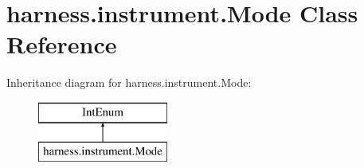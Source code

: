 \hypertarget{classharness_1_1instrument_1_1_mode}{}\section{harness.\+instrument.\+Mode Class Reference}
\label{classharness_1_1instrument_1_1_mode}
Inheritance diagram for harness.\+instrument.\+Mode\+:\begin{figure}[H]
\begin{center}
\leavevmode
\includegraphics[height=2.000000cm]{d2/df9/classharness_1_1instrument_1_1_mode}
\end{center}
\end{figure}
